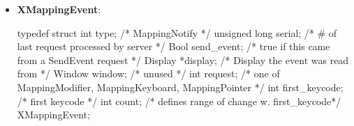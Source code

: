\documentclass{report}
\begin{document}
\begin{itemize}
            \textbf{Possible errors}:
            \begin{itemize}
                \item None.
            \end{itemize}
        \item \textbf{XMappingEvent}:
            \bigbreak \noindent 
            \begin{cppcode}
                typedef struct {
                    int type;               /* MappingNotify */
                    unsigned long serial;   /* # of last request processed by server */
                    Bool send_event;        /* true if this came from a SendEvent request */
                    Display *display;       /* Display the event was read from */
                    Window window;          /* unused */
                    int request;            /* one of MappingModifier, MappingKeyboard,
                    MappingPointer */
                    int first_keycode;      /* first keycode */
                    int count;              /* defines range of change w. first_keycode*/
                } XMappingEvent;
            \end{cppcode}

    \end{itemize}
\end{document}
